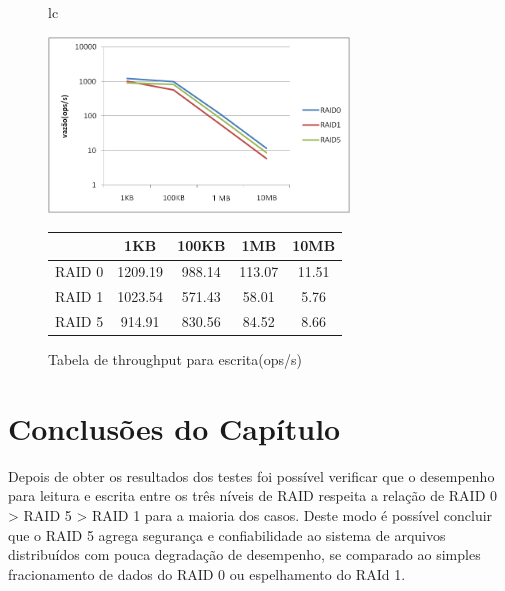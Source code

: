 	\begin{figure}[h]
		\begin{tabular}{lc}
			\begin{minipage}{.50\textwidth}
				\begin{center}
					
					\includegraphics[clip,width=8.0cm]{images/resultados/throughput_escrita.png}
					\caption{Gráfico de throughput para escrita}
					\label{fig:throughput_e}
					
				\end{center}
				
			\end{minipage}
			
			\begin{minipage}{.5\textwidth}
				\makeatletter
				\def\@captype{table}
				\makeatother
				\caption{Tabela de throughput para escrita(ops/s)}
				\label{tab:throughput_e}
				\begin{center}
					\begin{tabular}{|c|c|c|c|c|} \hline
						& 1KB & 100KB & 1MB & 10MB \\ \hline
						
						RAID 0	& 1209.19 & 988.14 & 113.07 & 11.51\\ \hline
						RAID 1	& 1023.54 & 571.43 & 58.01  & 5.76 \\ \hline
						RAID 5	& 914.91  & 830.56 & 84.52  & 8.66 \\ \hline
						
						
					\end{tabular}
				\end{center}
				
			\end{minipage}
		\end{tabular}
	\end{figure}
	
	\section{Conclusões do Capítulo}
	
	Depois de obter os resultados dos testes foi possível verificar que o desempenho para leitura e escrita entre os três níveis de RAID respeita a relação de RAID 0 > RAID 5 > RAID 1 para a maioria dos casos. Deste modo é possível concluir que o RAID 5 agrega segurança e confiabilidade ao sistema de arquivos distribuídos com pouca degradação de desempenho, se comparado ao simples fracionamento de dados do RAID 0 ou espelhamento do RAId 1. 
	\\